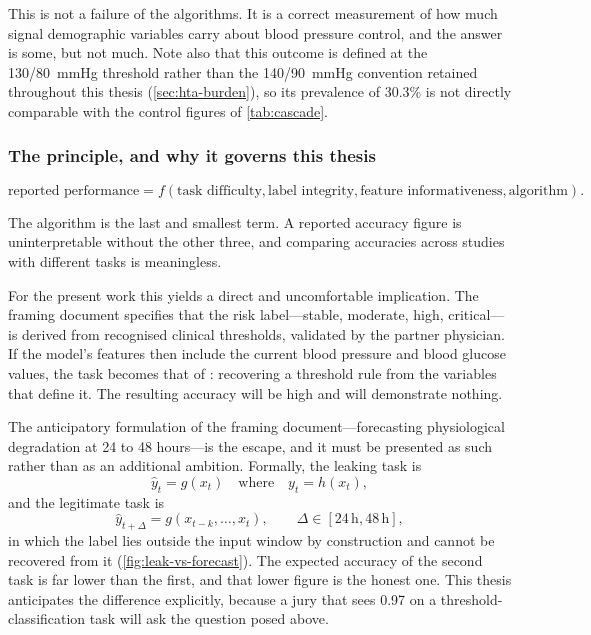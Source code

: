 \documentclass[12pt,a4paper,oneside]{report}
\begin{document}
This is not a failure of the algorithms. It is a correct measurement of how much signal demographic variables carry about blood pressure control, and the answer is some, but not much. Note also that this outcome is defined at the 130/80~mmHg threshold rather than the 140/90~mmHg convention retained throughout this thesis (\cref{sec:hta-burden}), so its prevalence of 30.3\% is not directly comparable with the control figures of \cref{tab:cascade}.

\subsubsection{The principle, and why it governs this thesis}\label{sec:principle}

\begin{equation}
  \text{reported performance} = f(\text{task difficulty}, \text{label integrity}, \text{feature informativeness}, \text{algorithm}).
\end{equation}

The algorithm is the last and smallest term. A reported accuracy figure is uninterpretable without the other three, and comparing accuracies across studies with different tasks is meaningless.

For the present work this yields a direct and uncomfortable implication. The framing document specifies that the risk label---stable, moderate, high, critical---is derived from recognised clinical thresholds, validated by the partner physician. If the model's features then include the current blood pressure and blood glucose values, the task becomes that of \textcite{efendi2025}: recovering a threshold rule from the variables that define it. The resulting accuracy will be high and will demonstrate nothing.

The anticipatory formulation of the framing document---forecasting physiological degradation at 24 to 48 hours---is the escape, and it must be presented as such rather than as an additional ambition. Formally, the leaking task is
\begin{equation}
  \hat{y}_t = g(x_t) \quad\text{where}\quad y_t = h(x_t),
\end{equation}
and the legitimate task is
\begin{equation}
  \hat{y}_{t+\Delta} = g(x_{t-k}, \dots, x_t), \qquad \Delta \in [24\,\text{h}, 48\,\text{h}],
\end{equation}
in which the label lies outside the input window by construction and cannot be recovered from it (\cref{fig:leak-vs-forecast}). The expected accuracy of the second task is far lower than the first, and that lower figure is the honest one. This thesis anticipates the difference explicitly, because a jury that sees 0.97 on a threshold-classification task will ask the question posed above.
\end{document}

